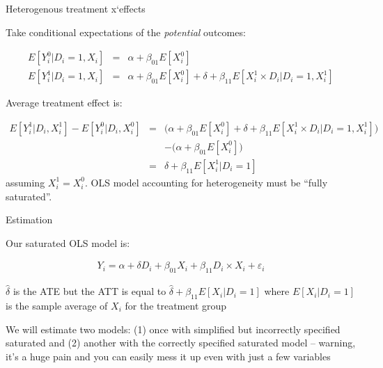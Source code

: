 \documentclass{beamer}
\begin{document}
\begin{frame}{Heterogenous treatment x`effects}

Take conditional expectations of the \emph{potential} outcomes:

\begin{eqnarray*}
E[Y^0_i | D_i=1, X_i] &=& \alpha + \beta_{01} E[X^0_i] \\
E[Y^1_i | D_i=1, X_i] &=& \alpha + \beta_{01} E[X^0_i] + \delta + \beta_{11} E[X^1_i \times D_i | D_i=1,X_i^1]
\end{eqnarray*}

\bigskip

Average treatment effect is: 

\bigskip

\footnotesize

\begin{eqnarray*}
E[Y_i^1 | D_i, X^1_i] - E[Y^0_i | D_i, X^0_i] &=& \bigg (  \alpha + \beta_{01} E[X^0_i] + \delta + \beta_{11} E[X^1_i \times D_i | D_i=1,X_i^1] \bigg ) \\
&& -  \bigg (\alpha + \beta_{01} E[X^0_i] \bigg ) \\
&=& \delta + \beta_{11}  E[X^1_i | D_i=1] 
\end{eqnarray*}assuming $X^1_i=X^0_i$. OLS model accounting for heterogeneity must be ``fully saturated''.


\end{frame}




\begin{frame}{Estimation}

Our saturated OLS model is:

\bigskip

\begin{eqnarray*}
Y_i = \alpha + \delta D_i + \beta_{01} X_i + \beta_{11} D_i \times X_i + \varepsilon_i
\end{eqnarray*}

$\widehat{\delta}$ is the ATE but the ATT is equal to $\widehat{\delta} + \beta_{11} E[X_i | D_i = 1]$ where $E[X_i | D_i=1]$ is the sample average of $X_i$ for the treatment group

\bigskip

We will estimate two models: (1) once with simplified but incorrectly specified saturated and (2) another with the correctly specified saturated model -- warning, it's a huge pain and you can easily mess it up even with just a few variables

\end{frame}
\end{document}
